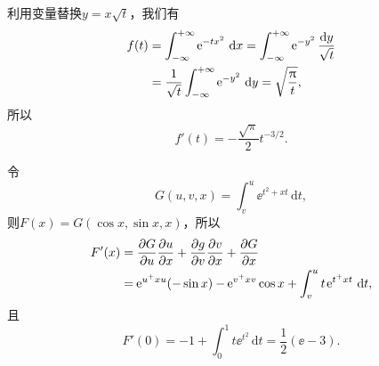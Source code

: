 \begin{ans}
  利用变量替换$y=x\sqrt t$，我们有
  \begin{align*}
    f(t) & = \int_{-\infty}^{+\infty} \operatorname{\!\!\;\mathrm e}^{-tx^2}\,\mathrm dx
    = \int_{-\infty}^{+\infty}\operatorname{\!\!\;\mathrm e}^{-y^2}\frac{\mathrm dy}{\sqrt t}\\
    & = \frac1{\sqrt t}\int_{-\infty}^{+\infty}\operatorname{\!\!\;\mathrm e}^{-y^2}\,\mathrm dy
    =\sqrt{\frac{\uppi} t},
  \end{align*}
  所以
  \[ f'(t)=-\frac{\sqrt\pi}2t^{-3/2}. \]
\end{ans}

\begin{ans}
  令
  \[ G(u,v,x) = \int_v^u\ee^{t^2+xt}\,\mathrm dt, \]
  则$F(x)=G(\cos x,\sin x,x)$，所以
  \begin{align*}
    F'(x) & = \frac{\partial G}{\partial u}\frac{\partial u}{\partial x} +\frac{\partial g}{\partial v} \frac{\partial v}{\partial x}+ \frac{\partial G}{\partial x}\\
          & = \operatorname{\!\!\;\mathrm e}^{u^+xu}(-\sin x)-\operatorname{\!\!\;\mathrm e}^{v^+xv}\cos x
          +\int_v^ut\operatorname{\!\!\;\mathrm e}^{t^+xt}\,\mathrm dt,
  \end{align*}
  且
  \[ F'(0)=-1+\int_0^1t\ee^{t^2}\,\mathrm dt=\frac12(\ee-3). \]
\end{ans}

